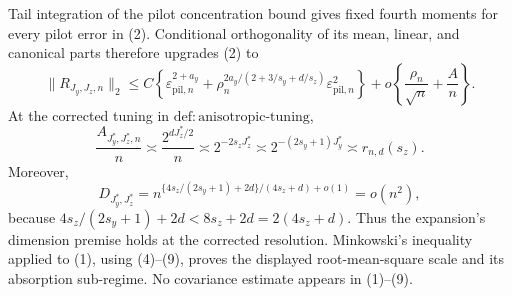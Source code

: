 Tail integration of the pilot concentration bound gives fixed fourth moments for every pilot error in (2). Conditional orthogonality of its mean, linear, and canonical parts therefore upgrades (2) to
\[
\|R_{J_y,J_z,n}\|_2
\le C\!\left\{\varepsilon_{\mathrm{pil},n}^{2+a_y}
+\rho_n^{2a_y/(2+3/s_y+d/s_z)}\varepsilon_{\mathrm{pil},n}^2\right\}
+o\!\left\{\frac{\rho_n}{\sqrt n}+\frac A n\right\}.         \tag{7}
\]
At the corrected tuning in \(\mathrm{def{:}anisotropic\text{-}tuning}\),
\[
\frac{A_{J_y^*,J_z^*,n}}n
\asymp\frac{2^{dJ_z^*/2}}n
\asymp2^{-2s_zJ_z^*}
\asymp2^{-(2s_y+1)J_y^*}
\asymp r_{n,d}(s_z).                                               \tag{8}
\]
Moreover,
\[
D_{J_y^*,J_z^*}
=n^{\{4s_z/(2s_y+1)+2d\}/(4s_z+d)+o(1)}=o(n^2),                 \tag{9}
\]
because \(4s_z/(2s_y+1)+2d<8s_z+2d=2(4s_z+d)\). Thus the expansion's dimension premise holds at the corrected resolution. Minkowski's inequality applied to (1), using (4)--(9), proves the displayed root-mean-square scale and its absorption sub-regime. No covariance estimate appears in (1)--(9).